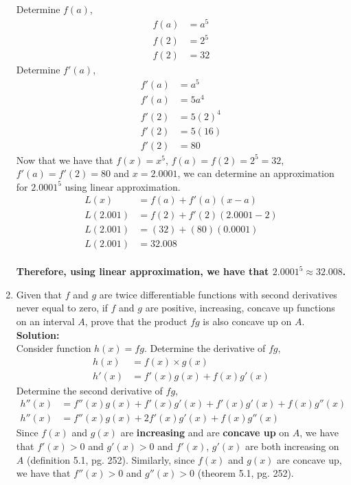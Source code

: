 \documentclass[12pt]{book}
\begin{document}
\begin{enumerate}
Determine $f(a)$,
\setcounter{equation}{0}
\begin{align}
    f(a) &= a^5 \\
    f(2) &= 2^5 \\
    f(2) &= 32
\end{align}
Determine $f'(a)$,
\begin{align}
    f'(a) &= a^5 \\
    f'(a) &= 5a^4 \\
    f'(2) &= 5(2)^4 \\
    f'(2) &= 5(16) \\
    f'(2) &= 80
\end{align}
Now that we have that $f(x) = x^5$, $f(a) = f(2) = 2^5 = 32$, $f'(a) = f'(2) = 80$ and $x=2.0001$, we can determine an approximation for $2.0001^5$ using linear approximation.
\begin{align}
    L(x) &= f(a) + f'(a)(x-a) \\
    L(2.001) &= f(2) + f'(2)(2.0001-2) \\
    L(2.001) &= (32) + (80)(0.0001) \\
    L(2.001) &= 32.008
\end{align}\\
\textbf{Therefore, using linear approximation, we have that $2.0001^5 \approx 32.008$.}




\newpage

\item Given that $f$ and $g$ are twice differentiable functions with second derivatives never equal to zero, if $f$ and $g$ are positive, increasing, concave up functions on an interval $A$, prove that the product $fg$ is also concave up on $A$.\\

\textbf{Solution:}\\
\setcounter{equation}{0}
Consider function $h(x)=fg$. Determine the derivative of $fg$,
\begin{align}
    h(x) &= f(x)\times g(x) \\
    h'(x) &= f'(x)g(x)+f(x)g'(x)
\end{align}
Determine the second derivative of $fg$,
\begin{align}
    h''(x) &= f''(x)g(x)+f'(x)g'(x)+f'(x)g'(x)+f(x)g''(x) \\
    h''(x) &= f''(x)g(x)+2f'(x)g'(x)+f(x)g''(x)
\end{align}
Since $f(x)$ and $g(x)$ are \textbf{increasing} and are \textbf{concave up} on $A$, we have that $f'(x) > 0$ and $g'(x) > 0$ and $f'(x)$, $g'(x)$ are both increasing on $A$ (definition 5.1, pg. 252). Similarly, since $f(x)$ and $g(x)$ are concave up, we have that $f''(x) > 0$ and $g''(x) > 0$ (theorem 5.1, pg. 252).\\


\end{enumerate}
\end{document}
